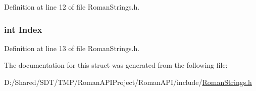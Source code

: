 Definition at line 12 of file Roman\+Strings.\+h.

\subsubsection[{\texorpdfstring{Index}{Index}}]{\setlength{\rightskip}{0pt plus 5cm}int Index}\hypertarget{struct_dynamic_string_a075e1e3c9dd399cef584d7338cc37938}{}\label{struct_dynamic_string_a075e1e3c9dd399cef584d7338cc37938}


Definition at line 13 of file Roman\+Strings.\+h.



The documentation for this struct was generated from the following file\+:\begin{DoxyCompactItemize}
\item 
D\+:/\+Shared/\+S\+D\+T/\+T\+M\+P/\+Roman\+A\+P\+I\+Project/\+Roman\+A\+P\+I/include/\hyperlink{_roman_strings_8h}{Roman\+Strings.\+h}\end{DoxyCompactItemize}
